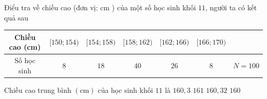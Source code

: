 \begin{ex}%
	Điểu tra về chiều cao (đơn vị: cm ) của một số học sinh khối $11$, người ta có kết quả sau
	\begin{center}
		\begin{tabular}{|c|c|c|c|c|c|c|}
			\hline Chiều cao (cm) & {$[150 ; 154)$} & {$[154 ; 158)$} & {$[158 ; 162)$} & {$[162 ; 166)$} & {$[166 ; 170)$} & \\
			\hline Số học sinh & $8$ & $18$ & $40$ & $26$ & $8$ & $N=100$ \\
			\hline
		\end{tabular}
	\end{center}
	Chiều cao trung bình $(\mathrm{cm})$ của học sinh khối $11$ là
	\choice
	{$160{,}3$}
	{$161$}
	{\True $160{,}32$}
	{$160$}
\end{ex}
\cauds

